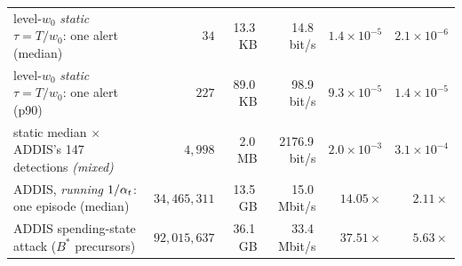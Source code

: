\begin{table}[t]
{\begin{tabular}{lrrrrr}
level-$w_0$ \emph{static} $\tau{=}T/w_0$: one alert (median) & $34$ & 13.3\,KB & 14.8\,bit/s & $1.4\times10^{-5}$ & $2.1\times10^{-6}$ \\
level-$w_0$ \emph{static} $\tau{=}T/w_0$: one alert (p90) & $227$ & 89.0\,KB & 98.9\,bit/s & $9.3\times10^{-5}$ & $1.4\times10^{-5}$ \\
static median $\times$ ADDIS's 147 detections \emph{(mixed)} & $4{,}998$ & 2.0\,MB & 2176.9\,bit/s & $2.0\times10^{-3}$ & $3.1\times10^{-4}$ \\
ADDIS, \emph{running} $1/\alpha_t$: one episode (median) & $34{,}465{,}311$ & 13.5\,GB & 15.0\,Mbit/s & $14.05\times$ & $2.11\times$ \\
ADDIS spending-state attack ($B^\ast$ precursors) & $92{,}015{,}637$ & 36.1\,GB & 33.4\,Mbit/s & $37.51\times$ & $5.63\times$ \\
\bottomrule
\end{tabular}}
\end{table}
